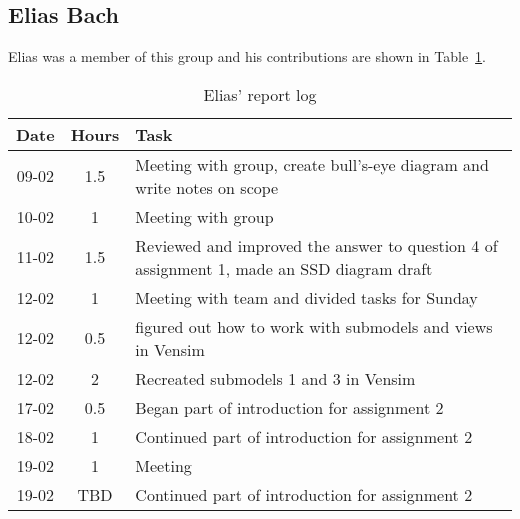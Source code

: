 \subsection{Elias Bach}
Elias was a member of this group and his contributions are shown in Table~\ref{tab:elias_log}. 
\begin{longtable}[c]{c|c|m{35em}}
\caption{Elias' report log}
\label{tab:elias_log}\\
\textbf{Date}& \textbf{Hours} & \textbf{Task} \\
\hline
\endfirsthead
%
\endhead
%
09-02 & 1.5 & Meeting with group, create bull's-eye diagram and write notes on scope\\
10-02 & 1 & Meeting with group \\
11-02 & 1.5 & Reviewed and improved the answer to question 4 of assignment 1, made an SSD diagram draft \\
12-02 & 1 & Meeting with team and divided tasks for Sunday\\ 
12-02 & 0.5 & figured out how to work with submodels and views in Vensim \\
12-02 & 2 & Recreated submodels 1 and 3 in Vensim \\
17-02 & 0.5 & Began part of introduction for assignment 2 \\
18-02 & 1 & Continued part of introduction for assignment 2 \\
19-02 & 1 & Meeting \\
19-02 & TBD & Continued part of introduction for assignment 2

\end{longtable}

